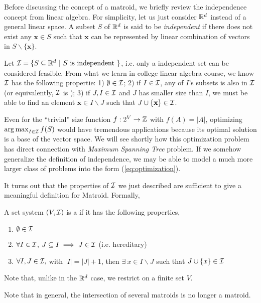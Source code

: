 Before discussing the concept of a matroid, we briefly review the independence concept from linear algebra. For simplicity, let us just consider $\mathbb{R}^d$ instead of a general linear space. A subset $S$ of $\mathbb{R}^d$ is said to be \emph{independent} if there does not exist any $\mathbf{x}\in S$ such that $\mathbf{x}$ can be represented by linear combination of vectors in $S\backslash\{\mathbf{x}\}$. 

Let $\mathcal{I} = \{S \subseteq \mathbb{R}^d~|~S ~\text{is independent}~\}$, i.e. only a independent set can be considered feasible. From what we learn in college linear algebra course, we know $\mathcal{I}$ has the following propertie: 1) $\emptyset \in \mathcal{I}$; 2) if $I\in \mathcal{I}$, any of $I$'s subsets is also in $\mathcal{I}$ (or equivalently, $\mathcal{I}$ is ); 3) if $J, I\in \mathcal{I}$ and $J$ has smaller size than $I$, we must be able to find an element  $\mathbf{x} \in I\backslash J$ such that $J\cup \{\mathbf{x}\} \in \mathcal{I}$. 

Even for the ``trivial'' size function $f: 2^V \rightarrow \mathbb{Z}$ with $f(A) = |A|$, optimizing $\operatorname*{arg\,max}_{I\in\mathcal{I}} f(S)$ would have tremendous applications because its optimal solution is a base of the vector space. We will see shortly how this optimization problem has direct connection with \emph{Maximum Spanning Tree} problem. If we somehow generalize the definition of independence, we may be able to model a much more larger class of problems into the form (\ref{eq:optimization}). 

It turns out that the properties of $\mathcal{I}$ we just described are sufficient to give a meaningful definition for Matroid. Formally, 
\begin{definition}[Matroid]
\label{def:matroid}
  A set system $(V, \mathcal{I})$ is a  if it has the following properties,
  \begin{enumerate}
  \item $\emptyset \in \mathcal{I}$
  \item $\forall I \in \mathcal{I}$, $J\subseteq I \implies J\in \mathcal{I}$ (i.e. hereditary)
  \item $\forall I, J \in \mathcal{I},$ with $|I| = |J| + 1$,  then $\exists~ x\in I\backslash J$ such that $J \cup \{x\}\in \mathcal{I}$ 
  \end{enumerate} 
\end{definition}
Note that, unlike in the $\mathbb{R}^d$ case, we restrict on a finite set $V$. 

Note that in general, the intersection of several matroids is no longer a matroid.


